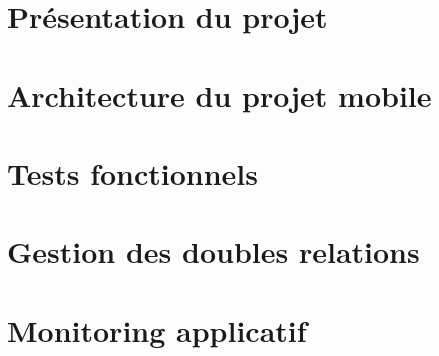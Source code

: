 
\section{Présentation du projet}
\label{prezAppNeuflize}
	
	
\section{Architecture du projet mobile}
	
	
\section{Tests fonctionnels}
	
	
\section{Gestion des doubles relations}
	
	
\section{Monitoring applicatif}
	